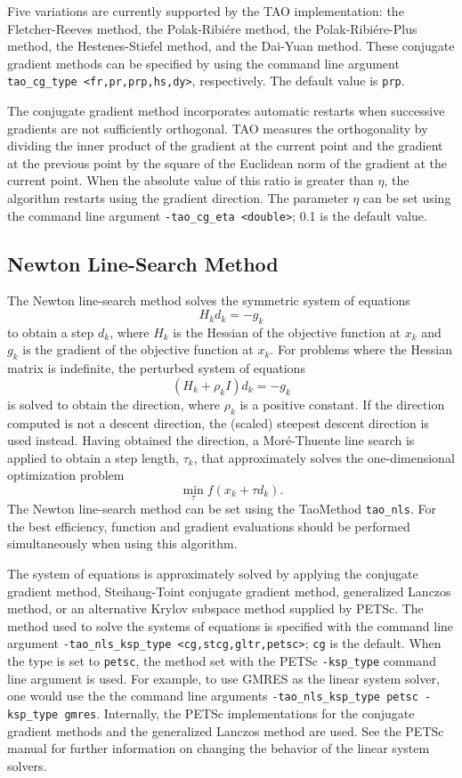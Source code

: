 Five variations are currently supported by the TAO implementation: the 
Fletcher-Reeves method, the Polak-Ribi\'ere method, the Polak-Ribi\'ere-Plus 
method\cite{NW99}, the Hestenes-Stiefel method, and the Dai-Yuan method.  
These conjugate gradient methods can be specified by using the command line 
argument {\tt tao\_cg\_type <fr,pr,prp,hs,dy>}, respectively.  The default 
value is {\tt prp}.  

The conjugate gradient method incorporates automatic restarts when successive 
gradients are not sufficiently orthogonal.  TAO measures the orthogonality by 
dividing the inner product of the gradient at the current point and the 
gradient at the previous point by the square of the Euclidean norm of 
the gradient at the current point.  When the absolute value of this 
ratio is greater than $\eta$, the algorithm restarts using the gradient 
direction.  The parameter $\eta$ can be set using the command line argument 
{\tt -tao\_cg\_eta <double>}; 0.1 is the default value.  

\subsection{Newton Line-Search Method}

The Newton line-search method solves the symmetric system of equations
\[
H_k d_k = -g_k
\]
to obtain a step $d_k$, where $H_k$ is the Hessian of the objective function
at $x_k$ and $g_k$ is the gradient of the objective function at $x_k$.
For problems where the Hessian matrix is indefinite, the perturbed system
of equations
\[
(H_k + \rho_k I) d_k = -g_k
\]
is solved to obtain the direction, where $\rho_k$ is a positive constant.
If the direction computed is not a descent direction, the (scaled) steepest 
descent direction is used instead.  Having obtained the direction, 
a Mor\'{e}-Thuente line search is applied to obtain a step length, 
$\tau_k$, that approximately solves the one-dimensional optimization 
problem
\[
\min_\tau f(x_k + \tau d_k).
\]
The Newton line-search method can be set using the TaoMethod {\tt tao\_nls}.
For the best efficiency, function and gradient evaluations should be 
performed simultaneously when using this algorithm.

The system of equations is approximately solved by applying the conjugate 
gradient method, Steihaug-Toint conjugate gradient method, generalized 
Lanczos method, or an alternative Krylov subspace method 
supplied by PETSc.  The method used to solve the systems of equations is 
specified with the command line argument 
{\tt -tao\_nls\_ksp\_type <cg,stcg,gltr,petsc>}; {\tt cg} 
is the default.  When the type is set to {\tt petsc}, the method set with 
the PETSc {\tt -ksp\_type} command line argument is used.  For example, to 
use GMRES as the linear system solver, one would use the the command line 
arguments {\tt -tao\_nls\_ksp\_type petsc -ksp\_type gmres}.  Internally,
the PETSc implementations for the conjugate gradient methods and the 
generalized Lanczos method are used.  See the PETSc manual for further 
information on changing the behavior of the linear system solvers.  


